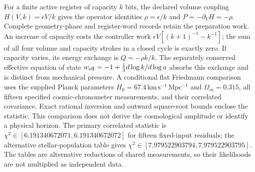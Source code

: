 For a finite active register of capacity $k$ bits, the declared volume coupling
$H(V,k)=\epsilon V/k$ gives the operator identities
$\rho=\epsilon/k$ and $P=-\partial_VH=-\rho$.
Complete geometry-phase and register-word records retain the preparation work.
An increase of capacity costs the controller work
$\epsilon V[(k+1)^{-1}-k^{-1}]$; the sum of all four volume and capacity
strokes in a closed cycle is exactly zero. If capacity varies, its energy
exchange is $Q=-\rho\dot{k}/k$. The separately conserved effective equation of
state $w_{\rm eff}=-1+\tfrac13d\log k/d\log a$ absorbs this exchange and is
distinct from mechanical pressure. A conditional flat Friedmann comparison
uses the supplied Planck parameters $H_0=67.4\,\mathrm{km\,s^{-1}\,Mpc^{-1}}$
and $\Omega_m=0.315$, all fifteen specified cosmic-chronometer measurements,
and their correlated covariance. Exact rational inversion and outward
square-root bounds enclose the statistic. This comparison does not derive
the cosmological amplitude or identify a physical horizon.
The primary correlated statistic is
$\chi^2\in[6.191340672071,6.191340672072]$ for fifteen fixed-input residuals;
the alternative stellar-population table gives
$\chi^2\in[7.979522903794,7.979522903795]$.
The tables are alternative reductions of shared measurements, so their
likelihoods are not multiplied as independent data.
